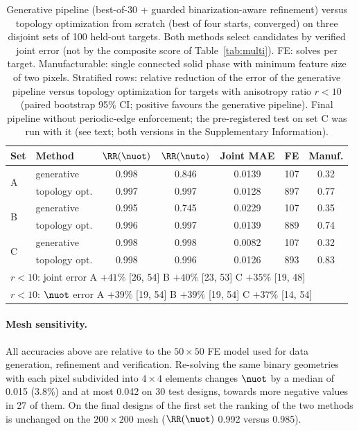 \begin{table}[t]
\centering
\caption{Generative pipeline (best-of-30 + guarded binarization-aware
refinement) versus topology optimization from scratch (best of four
starts, converged) on three disjoint sets of 100 held-out targets. Both
methods select candidates by verified joint error (not by the composite
score of Table~\ref{tab:multi}). FE:
solves per target. Manufacturable: single connected solid phase with
minimum feature size of two pixels. Stratified rows: relative reduction of
the error of the generative pipeline versus topology optimization for targets
with anisotropy ratio $r<10$ (paired bootstrap 95\% CI; positive favours the
generative pipeline). Final pipeline without periodic-edge enforcement; the
pre-registered test on set C was run with it (see text; both versions in the
Supplementary Information).}
\label{tab:simp}
\small
\setlength{\tabcolsep}{3.5pt}
\begin{tabular}{llccccc}
\toprule
Set & Method & $\RR(\nuot)$ & $\RR(\nuto)$ & Joint MAE & FE & Manuf.\\
\midrule
\multirow{2}{*}{A} & generative & 0.998 & 0.846 & 0.0139 & 107 & 0.32\\
 & topology opt. & 0.997 & 0.997 & 0.0128 & 897 & 0.77\\
\multirow{2}{*}{B} & generative & 0.995 & 0.745 & 0.0229 & 107 & 0.35\\
 & topology opt. & 0.996 & 0.997 & 0.0139 & 889 & 0.74\\
\multirow{2}{*}{C} & generative & 0.998 & 0.998 & 0.0082 & 107 & 0.32\\
 & topology opt. & 0.998 & 0.996 & 0.0126 & 893 & 0.83\\
\midrule
\multicolumn{7}{l}{$r<10$: joint error \;A $+41\%$ [26, 54] \;B $+40\%$ [23, 53] \;C $+35\%$ [19, 48]}\\
\multicolumn{7}{l}{$r<10$: $\nuot$ error \;A $+39\%$ [19, 54] \;B $+39\%$ [19, 54] \;C $+37\%$ [14, 54]}\\
\bottomrule
\end{tabular}
\end{table}

\paragraph{Mesh sensitivity.}
All accuracies above are relative to the $50\times50$ FE model used for
data generation, refinement and verification. Re-solving the same binary
geometries with each pixel subdivided into $4\times4$ elements changes
$\nuot$ by a median of 0.015 (3.8\%) and at most 0.042 on 30 test designs,
towards more negative values in 27 of them. On the final designs of the
first set the ranking of the two methods is unchanged on the $200\times200$
mesh ($\RR(\nuot)$ 0.992 versus 0.985).

